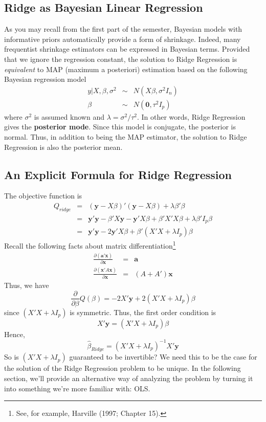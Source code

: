 \subsection{Ridge as Bayesian Linear Regression}
As you may recall from the first part of the semester, Bayesian models with informative priors automatically provide a form of shrinkage. Indeed, many frequentist shrinkage estimators can be expressed in Bayesian terms. Provided that we ignore the regression constant, the solution to Ridge Regression is \emph{equivalent} to MAP (maximum a posteriori) estimation based on the following  Bayesian regression model
	\begin{eqnarray*}
		y|X, \beta, \sigma^2 &\sim& N(X\beta,\sigma^2 I_n) \\
		\beta &\sim& N(\mathbf{0}, \tau^2 I_p)
	\end{eqnarray*}
where $\sigma^2$ is assumed known and $\lambda = \sigma^2/\tau^2$. In other words, Ridge Regression gives the \textbf{posterior mode}. Since this model is conjugate, the posterior is normal. Thus, in addition to being the MAP estimator, the solution to Ridge Regression is also the posterior mean.


\subsection{An Explicit Formula for Ridge Regression}
The objective function is
\begin{eqnarray*}
	Q_{ridge}&=& (\mathbf{y} - X\beta)' (\mathbf{y} - X\beta) + \lambda \beta'\beta\\
	&=&\mathbf{y}'\mathbf{y} - \beta'X \mathbf{y} - \mathbf{y}'X\beta + \beta'X'X \beta + \lambda \beta' I_p \beta\\
	&=& \mathbf{y}'\mathbf{y} - 2 \mathbf{y}'X\beta + \beta'(X'X + \lambda I_p)\beta
\end{eqnarray*}
Recall the following facts about matrix differentiation\footnote{See, for example, Harville (1997; Chapter 15).}
	\begin{eqnarray*}
		\frac{\partial (\mathbf{a}' \mathbf{x})}{\partial \mathbf{x}}  &=& \mathbf{a}\\
		\frac{\partial( \mathbf{x}'A \mathbf{x})}{\partial \mathbf{x}} &=& (A + A')\mathbf{x}
	\end{eqnarray*}
Thus, we have 
$$\frac{\partial}{\partial \beta} Q(\beta) = -2X'\mathbf{y} + 2(X'X + \lambda I_p)\beta$$
since $(X'X + \lambda I_p)$ is symmetric. Thus, the first order condition is 
	$$X'\textbf{y} = (X'X + \lambda I_p)\beta$$
Hence,
	$$\widehat{\beta}_{Ridge} = (X'X + \lambda I_p)^{-1} X'\textbf{y}$$
So is $(X'X + \lambda I_p)$ guaranteed to be invertible? We need this to be the case for the solution of the Ridge Regression problem to be unique. In the following section, we'll provide an alternative way of analyzing the problem by turning it into something we're more familiar with: OLS.

